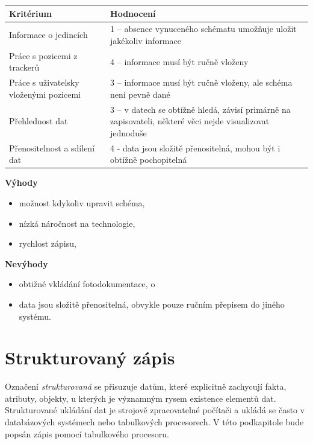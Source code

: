 \begin{table}[h]
	\begin{tabular}{ l | l }
		Kritérium                              & Hodnocení \\
 		\hline			
		Informace o jedincích                  & 1 -- absence vynuceného schématu umožňuje uložit jakékoliv informace          \\
		Práce s pozicemi z trackerů            & 4 -- informace musí být ručně vloženy          \\
		Práce s uživatelsky vloženými pozicemi & 3 -- informace musí být ručně vloženy, ale schéma není pevně dané          \\
		Přehlednost dat                        & 3 -- v datech se obtížně hledá, závisí primárně na zapisovateli, některé věci nejde visualizovat jednoduše          \\
		Přenositelnost a sdílení dat           & 4 - data jsou složitě přenositelná, mohou být i obtížně pochopitelná          \\
		\hline	
	\end{tabular}
\end{table}

\textbf{Výhody}

\begin{itemize}
	\item možnost kdykoliv upravit schéma,
	\item nízká náročnost na technologie,
	\item rychlost zápisu,
\end{itemize}

\textbf{Nevýhody}

\begin{itemize}
	\item obtižné vkládání fotodokumentace, o
	\item data jsou složitě přenositelná, obvykle pouze ručním přepisem do jiného systému.
\end{itemize}

\section{Strukturovaný zápis}


Označení \emph{strukturovaná} se přisuzuje datům, které explicitně zachycují fakta, atributy, objekty, u kterých je významným rysem existence elementů dat. Strukturované ukládání dat je strojově zpracovatelné počítači a ukládá se často v databázových systémech nebo tabulkových procesorech. V této podkapitole bude popsán zápis pomocí tabulkového procesoru.

